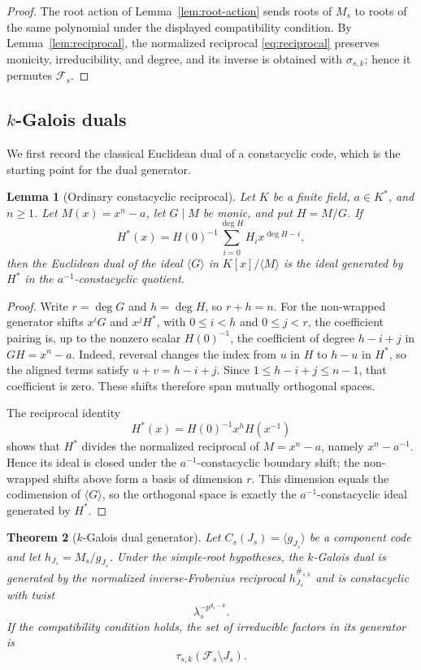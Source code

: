 \documentclass[10pt,a4paper]{article}
\newcommand{\Fs}{\mathcal F_s}
\numberwithin{equation}{section}
\theoremstyle{plain}
\newtheorem{theorem}{Theorem}[section]
\newtheorem{lemma}[theorem]{Lemma}
\theoremstyle{definition}
\theoremstyle{remark}
\begin{document}
\begin{proof}
The root action of Lemma~\ref{lem:root-action} sends roots of $M_s$ to roots of
the same polynomial under the displayed compatibility condition. By
Lemma~\ref{lem:reciprocal}, the normalized reciprocal \eqref{eq:reciprocal}
preserves monicity, irreducibility, and degree, and its inverse is obtained with
$\sigma_{s,k}$; hence it permutes $\Fs$.
\end{proof}

\subsection{\texorpdfstring{$k$}{k}-Galois duals}\label{sec:duals}

We first record the classical Euclidean dual of a constacyclic code, which is the
starting point for the dual generator.

\begin{lemma}[Ordinary constacyclic reciprocal]\label{lem:ordinary-reciprocal}
Let $K$ be a finite field, $a\in K^*$, and $n\geq1$. Let $M(x)=x^n-a$, let
$G\mid M$ be monic, and put $H=M/G$. If
\[
H^*(x)=H(0)^{-1}\sum_{i=0}^{\deg H}H_i x^{\deg H-i},
\]
then the Euclidean dual of the ideal $\langle G\rangle$ in
$K[x]/\langle M\rangle$ is the ideal generated by $H^*$ in the
$a^{-1}$-constacyclic quotient.
\end{lemma}

\begin{proof}
Write $r=\deg G$ and $h=\deg H$, so $r+h=n$. For the non-wrapped generator shifts
$x^iG$ and $x^jH^*$, with $0\leq i<h$ and $0\leq j<r$, the coefficient pairing
is, up to the nonzero scalar $H(0)^{-1}$, the coefficient of degree $h-i+j$ in
$GH=x^n-a$. Indeed, reversal changes the index from $u$ in $H$ to $h-u$ in $H^*$,
so the aligned terms satisfy $u+v=h-i+j$. Since $1\leq h-i+j\leq n-1$, that
coefficient is zero. These shifts therefore span mutually orthogonal spaces.

The reciprocal identity
\[
H^*(x)=H(0)^{-1}x^hH(x^{-1})
\]
shows that $H^*$ divides the normalized reciprocal of $M=x^n-a$, namely
$x^n-a^{-1}$. Hence its ideal is closed under the $a^{-1}$-constacyclic boundary
shift; the non-wrapped shifts above form a basis of dimension $r$. This dimension
equals the codimension of $\langle G\rangle$, so the orthogonal space is exactly
the $a^{-1}$-constacyclic ideal generated by $H^*$.
\end{proof}

\begin{theorem}[$k$-Galois dual generator]\label{thm:dual-generator}
Let $C_s(J_s)=\langle g_{J_s}\rangle$ be a component code and let
$h_{J_s}=M_s/g_{J_s}$. Under the simple-root hypotheses, the $k$-Galois dual is
generated by the normalized inverse-Frobenius reciprocal
$h_{J_s}^{\#_{s,k}}$ and is constacyclic with twist
\[
\lambda_s^{-p^{d_s-k}} .
\]
If the compatibility condition holds, the set of irreducible factors in its
generator is
\[
\tau_{s,k}(\Fs\setminus J_s).
\]
\end{theorem}
\end{document}
